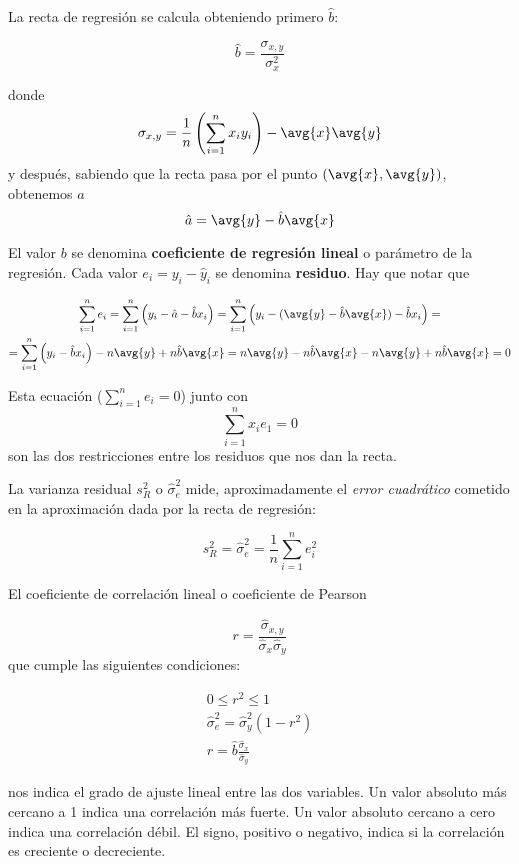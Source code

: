 \documentclass{apuntes}
\begin{document}
La recta de regresión se calcula obteniendo primero $\hat{b}$:

\[ \hat{b} = \frac{\sigma_{x,y}}{\sigma^2_x} \]

donde \[ \sigma_{x,y} = \frac{1}{n} \left( \sum_{i=1}^n x_i y_i\right)  - \avg{x}\avg{y} \] y después, sabiendo que la recta pasa por el punto $(\avg{x}, \avg{y})$, obtenemos $\hat{a}$ \[ \hat{a} = \avg{y} - \hat{b}\avg{x} \]

El valor $b$ se denomina \textbf{coeficiente de regresión lineal} o parámetro de la regresión. Cada valor $e_i= y_i - \hat{y}_i$ se denomina \textbf{residuo}. Hay que notar que

\begin{gather*}
 \sum_{i=1}^n e_i = \sum_{i=1}^n \left(y_i - \hat{a} -\hat{b}x_i \right)= \sum_{i=1}^n\left( y_i - (\avg{y} - \hat{b}\avg{x}) - \hat{b}x_i \right) = \\
 = \sum_{i=1}^n  \left(y_i - \hat{b}x_i\right) - n\avg{y}  + n\hat{b}\avg{x} = n\avg{y} - n \hat{b}\avg{x}- n\avg{y} + n\hat{b}\avg{x} = 0 \end{gather*}

Esta ecuación ($\sum_{i=1}^n e_i = 0$) junto con \[ \sum_{i=1}^n x_i e_1 = 0 \] son las dos restricciones entre los residuos que nos dan la recta.

\begin{defn}
La varianza residual $s_R^2$ o $\hat{\sigma}_e^2$ mide, aproximadamente el \textit{error cuadrático} cometido en la aproximación dada por la recta de regresión:

\[ s_R^2 = \hat{\sigma}_e^2 = \frac{1}{n}\sum_{i=1}^n e_i^2 \]
\end{defn}

\begin{defn}
El coeficiente de correlación lineal o coeficiente de Pearson

\[ r = \frac{\hat{\sigma}_{x,y}}{\hat{\sigma}_x \hat{\sigma}_y} \] que cumple las siguientes condiciones:

\begin{gather*}
0 ≤ r^2 ≤ 1 \\
\hat{\sigma}_e^2 = \hat{\sigma}_y^2(1-r^2) \\
r = \hat{b}\frac{\hat{\sigma}_x}{\hat{\sigma}_y} 
\end{gather*}

nos indica el grado de ajuste lineal entre las dos variables. Un valor absoluto más cercano a 1 indica una correlación más fuerte. Un valor absoluto cercano a cero indica una correlación débil. El signo, positivo o negativo, indica si la correlación es creciente o decreciente.
\end{defn}
\end{document}
